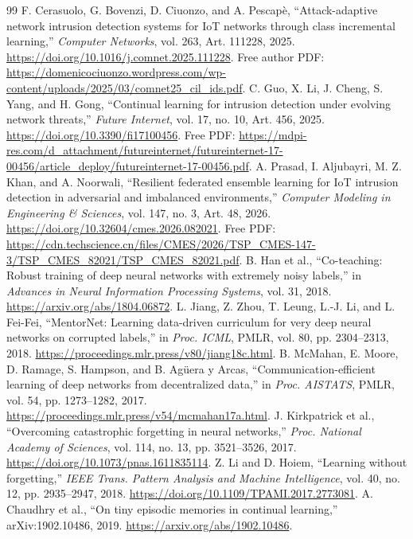 \documentclass[10pt,a4paper]{article}
\begin{document}
\begin{thebibliography}{99}
 F. Cerasuolo, G. Bovenzi, D. Ciuonzo, and A. Pescap\`e, ``Attack-adaptive network intrusion detection systems for IoT networks through class incremental learning,'' \emph{Computer Networks}, vol. 263, Art. 111228, 2025. \url{https://doi.org/10.1016/j.comnet.2025.111228}. Free author PDF: \url{https://domenicociuonzo.wordpress.com/wp-content/uploads/2025/03/comnet25_cil_ids.pdf}.
 C. Guo, X. Li, J. Cheng, S. Yang, and H. Gong, ``Continual learning for intrusion detection under evolving network threats,'' \emph{Future Internet}, vol. 17, no. 10, Art. 456, 2025. \url{https://doi.org/10.3390/fi17100456}. Free PDF: \url{https://mdpi-res.com/d_attachment/futureinternet/futureinternet-17-00456/article_deploy/futureinternet-17-00456.pdf}.
 A. Prasad, I. Aljubayri, M. Z. Khan, and A. Noorwali, ``Resilient federated ensemble learning for IoT intrusion detection in adversarial and imbalanced environments,'' \emph{Computer Modeling in Engineering \& Sciences}, vol. 147, no. 3, Art. 48, 2026. \url{https://doi.org/10.32604/cmes.2026.082021}. Free PDF: \url{https://cdn.techscience.cn/files/CMES/2026/TSP_CMES-147-3/TSP_CMES_82021/TSP_CMES_82021.pdf}.
 B. Han et al., ``Co-teaching: Robust training of deep neural networks with extremely noisy labels,'' in \emph{Advances in Neural Information Processing Systems}, vol. 31, 2018. \url{https://arxiv.org/abs/1804.06872}.
 L. Jiang, Z. Zhou, T. Leung, L.-J. Li, and L. Fei-Fei, ``MentorNet: Learning data-driven curriculum for very deep neural networks on corrupted labels,'' in \emph{Proc. ICML}, PMLR, vol. 80, pp. 2304--2313, 2018. \url{https://proceedings.mlr.press/v80/jiang18c.html}.
 B. McMahan, E. Moore, D. Ramage, S. Hampson, and B. Ag\"uera y Arcas, ``Communication-efficient learning of deep networks from decentralized data,'' in \emph{Proc. AISTATS}, PMLR, vol. 54, pp. 1273--1282, 2017. \url{https://proceedings.mlr.press/v54/mcmahan17a.html}.
 J. Kirkpatrick et al., ``Overcoming catastrophic forgetting in neural networks,'' \emph{Proc. National Academy of Sciences}, vol. 114, no. 13, pp. 3521--3526, 2017. \url{https://doi.org/10.1073/pnas.1611835114}.
 Z. Li and D. Hoiem, ``Learning without forgetting,'' \emph{IEEE Trans. Pattern Analysis and Machine Intelligence}, vol. 40, no. 12, pp. 2935--2947, 2018. \url{https://doi.org/10.1109/TPAMI.2017.2773081}.
 A. Chaudhry et al., ``On tiny episodic memories in continual learning,'' arXiv:1902.10486, 2019. \url{https://arxiv.org/abs/1902.10486}.

\end{thebibliography}
\end{document}
